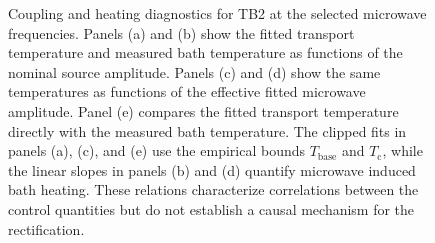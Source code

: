         \begin{figure}[p]
            \centering
            \vspace{3mm}
            \vspace{3mm}
            \vspace{3mm}
            \vspace{3mm}
            \vspace{3mm}
            \caption{
                Coupling and heating diagnostics for TB2 at the selected microwave frequencies. Panels (a) and (b) show the fitted transport temperature and measured bath temperature as functions of the nominal source amplitude. Panels (c) and (d) show the same temperatures as functions of the effective fitted microwave amplitude. Panel (e) compares the fitted transport temperature directly with the measured bath temperature. The clipped fits in panels (a), (c), and (e) use the empirical bounds $T_\mathrm{base}$ and $T_\mathrm{c}$, while the linear slopes in panels (b) and (d) quantify microwave induced bath heating. These relations characterize correlations between the control quantities but do not establish a causal mechanism for the rectification.
            }
            \label{fig:tb:asym:control-fits}
        \end{figure}



